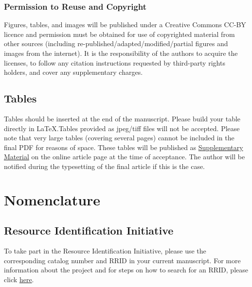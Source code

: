 \documentclass[utf8]{FrontiersinHarvard} %
\renewcommand*{\|}[1][]{\nonscript\:#1\vert\nonscript\:\mathopen{}}
\begin{document}
\subsubsection{Permission to Reuse and Copyright}
Figures, tables, and images will be published under a Creative Commons CC-BY licence and permission must be obtained for use of copyrighted material from other sources (including re-published/adapted/modified/partial figures and images from the internet). It is the responsibility of the authors to acquire the licenses, to follow any citation instructions requested by third-party rights holders, and cover any supplementary charges.

\subsection{Tables}
Tables should be inserted at the end of the manuscript. Please build your table directly in LaTeX.Tables provided as jpeg/tiff files will not be accepted. Please note that very large tables (covering several pages) cannot be included in the final PDF for reasons of space. These tables will be published as \href{http://home.frontiersin.org/about/author-guidelines#SupplementaryMaterial}{Supplementary Material} on the online article page at the time of acceptance. The author will be notified during the typesetting of the final article if this is the case. 

\section{Nomenclature}

\subsection{Resource Identification Initiative}
To take part in the Resource Identification Initiative, please use the corresponding catalog number and RRID in your current manuscript. For more information about the project and for steps on how to search for an RRID, please click \href{http://www.frontiersin.org/files/pdf/letter_to_author.pdf}{here}.
\end{document}
